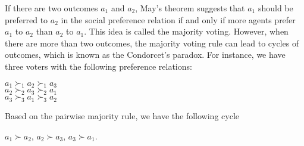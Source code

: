 If there are two outcomes $a_1$ and $a_2$,
May's theorem \cite{May52} suggests that $a_1$ should be
preferred to $a_2$ in the social preference relation
if and only if more agents prefer $a_1$ to $a_2$ than
$a_2$ to $a_1$.
This idea is called the majority voting.
However, when there are more than two outcomes,
the majority voting rule can lead to cycles of
outcomes, which is known as the Condorcet's paradox.
For instance, we have three voters with the following
preference relations:
\begin{center}
	$a_1 \succ_1 a_2 \succ_1 a_3$\\
	$a_2 \succ_2 a_3 \succ_2 a_1$\\
	$a_3 \succ_3 a_1 \succ_3 a_2$
\end{center}
Based on the pairwise majority rule, we have the following cycle
\begin{center}
	$a_1 \succ a_2$, $a_2 \succ a_3$, $a_3 \succ a_1$. 
\end{center}

%
%



